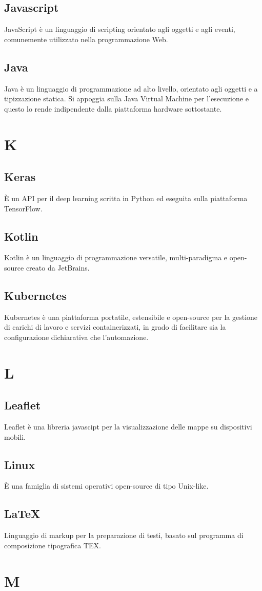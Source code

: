 \subsection{Javascript} JavaScript è un linguaggio di scripting orientato agli oggetti e agli eventi, comunemente utilizzato nella programmazione Web.
\subsection{Java} Java è un linguaggio di programmazione ad alto livello, orientato agli oggetti e a tipizzazione statica. Si appoggia sulla Java Virtual Machine per l'esecuzione e questo lo rende indipendente dalla piattaforma hardware sottostante.
\newpage \section{K}
\subsection{Keras} È un API per il deep learning scritta in Python ed eseguita sulla piattaforma TensorFlow.
\subsection{Kotlin} Kotlin è un linguaggio di programmazione versatile, multi-paradigma e open-source creato da JetBrains.
\subsection{Kubernetes} Kubernetes è una piattaforma portatile, estensibile e open-source per la gestione di carichi di lavoro e servizi containerizzati, in grado di facilitare sia la configurazione dichiarativa che l'automazione.
\newpage \section{L}
\subsection{Leaflet} Leaflet è una libreria javascipt per la visualizzazione delle mappe su dispositivi mobili.
\subsection{Linux} È una famiglia di sistemi operativi open-source di tipo Unix-like.
\subsection{\LaTeX} Linguaggio di markup per la preparazione di testi, basato sul programma di composizione tipografica TEX.
\newpage \section{M}
